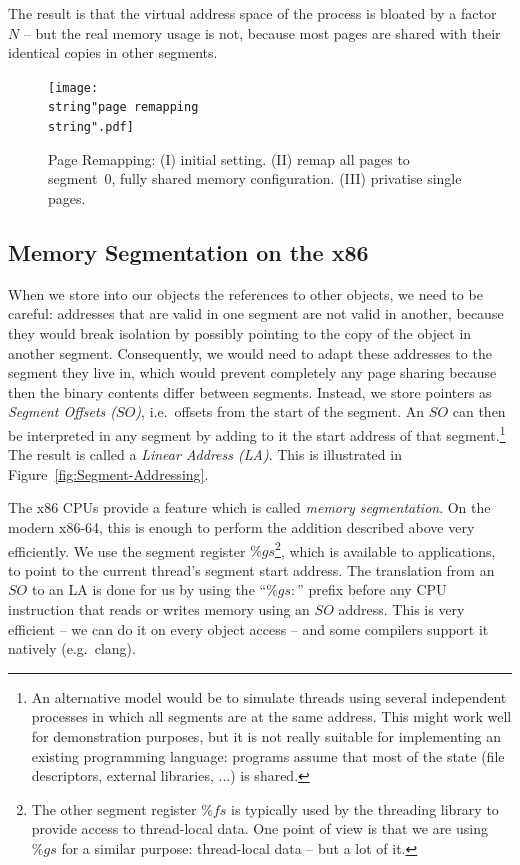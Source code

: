 \documentclass{sigplanconf}
\begin{document}
The result is that the virtual address space of the process is bloated
by a factor $N$ -- but the real memory usage is not, because most
pages are shared with their identical copies in other segments.

\begin{figure}[h]
  \centering
  \texttt{[image: \\string"page remapping\\string".pdf]}
  \caption{Page Remapping: (I) initial setting. (II) remap all pages to
    segment~0, fully shared memory configuration. (III) privatise single
    pages.\label{fig:Page-Remapping}}
\end{figure}


\subsection{Memory Segmentation on the x86}

When we store into our objects the references to other objects, we
need to be careful: addresses that are valid in one segment are not
valid in another, because they would break isolation by possibly pointing to
the copy of the object in another segment.  Consequently, we would
need to adapt these addresses to the segment they live in, which would
prevent completely any page sharing because then the binary contents
differ between segments.  Instead, we store pointers as
\emph{Segment Offsets ($SO$)}, i.e.\ offsets from the start of the
segment.  An $SO$ can then be interpreted in any segment by adding to
it the start address of that segment.\footnote{An alternative model
would be to simulate threads using several independent processes in
which all segments are at the same address.  This might work well for
demonstration purposes, but it is not really suitable for implementing
an existing programming language: programs assume that most of the
state (file descriptors, external libraries, ...) is shared.} The
result is called a \emph{Linear Address (LA)}. This is illustrated in
Figure~\ref{fig:Segment-Addressing}.

The x86 CPUs provide a feature which is called \emph{memory
segmentation}.  On the modern x86-64, this is enough to perform the
addition described above very efficiently.  We use the segment
register $\%gs$\footnote{The other segment register $\%fs$ is
typically used by the threading library to provide access to
thread-local data.  One point of view is that we are using $\%gs$ for
a similar purpose: thread-local data -- but a lot of it.}, which is
available to applications, to point to the current thread's segment
start address.  The translation from an $SO$ to an LA is done for us by
using the ``$\%gs\colon$'' prefix before any CPU instruction that
reads or writes memory using an $SO$ address.  This is very efficient
-- we can do it on every object access -- and some compilers support it
natively (e.g.\ clang).
\end{document}
